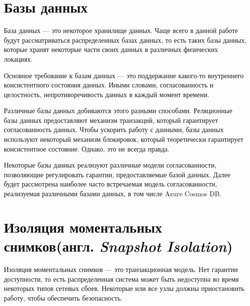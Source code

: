 \documentclass[14pt,  openany]{book}
\begin{document}
\section{Базы данных}
База данных --- это некоторое хранилище данных.  Чаще всего в данной работе будут рассматриваться распределенных базах данных, то есть таких базы данных,  которые хранят некоторые части своих данных в различных физических локациях.
\par
Основное требование к базам данных --- это поддержание какого-то внутреннего консистентного состояния данных. Иными словами, согласованность и целостность, непротиворечивость данных в каждый момент времени.
\par
Различные базы данных добиваются этого разными способами. Реляционные базы данных предоставляют механизм транзакций, который гарантирует согласованность данных. Чтобы ускорить работу с данными, базы данных используют некоторый механизм блокировок, который теоретически гарантирует консистентное состояние. Однако, это не всегда правда.
\par
Некоторые базы данных реализуют различные модели согласованности, позволяющие регулировать гарантии, предоставляемые базой данных. Далее будет рассмотрена наиболее часто встречаемая модель согласованности, реализуемая различными базами данных, в том числе Azure Cosmos DB.

\section{Изоляция моментальных снимков(англ.  \textit{Snapshot Isolation})\cite{jepsenConsistencyModels}}
Изоляция моментальных снимков --- это транзакционная модель. Нет гарантии доступности, то есть распределенная система может быть недоступна во время некоторых типов сетевых сбоев. Некоторые или все узлы должны приостановить работу, чтобы обеспечить безопасность.
\end{document}
